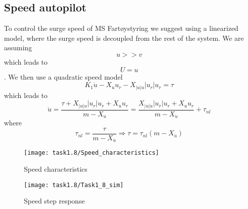 
\subsection{Speed autopilot}\label{sec:prob1.2}
To control the surge speed of MS Fartøystyring we suggest using a linearized model, where the surge speed is decoupled from the rest of the system. We are assuming $$u>>v$$ which leads to $$U=u$$.
We then use a quadratic speed model
\begin{equation}
K_1 \dot{u} - X_u u_r - X_{|u| u} |u_r| u_r=\tau
\end{equation}
which leads to
\begin{equation}
\dot{u} = \frac{ \tau + X_{|u|u} |u_r| u_r +X_u u_r }{ m-X_{\dot{u}} } 
= \frac{X_{|u|u} |u_r| u_r +X_u u_r }{ m-X_{\dot{u}} } + \tau_{nl}
\end{equation}
where
\begin{equation}
\tau_{nl}  = \frac{ \tau}{ m-X_{\dot{u}} } \Rightarrow \tau = \tau_{nl}(m-X_{\dot{u}})
\end{equation}

\begin{figure}[H]
    \centering
    \texttt{[image: task1.8/Speed\_characteristics]}
    \caption{Speed characteristics}
    \label{fig:1.8-speed}
\end{figure}

\begin{figure}[H]
    \centering
    \texttt{[image: task1.8/Task1\_8\_sim]}
    \caption{Speed step response}
    \label{fig:1.8-step}
\end{figure}